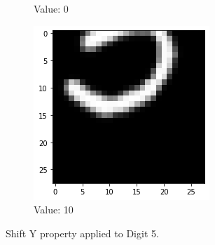 \begin{figure}[htb!]
\begin{subfigure}[b]{.3\textwidth}
            \caption{Value: 0}
            \label{fig:Rotate-misclass0}
        \end{subfigure}%
        \begin{subfigure}[b]{.3\textwidth}
            \centering
            \includegraphics[width=\linewidth]{images/shifty3.png}
            \caption{Value: 10}
            \label{fig:Rotate-misclass0}
        \end{subfigure}
        
        \caption{Shift Y property applied to Digit 5.}
        \label{fig:Rotate-misclassifications}
    \end{figure}
    \FloatBarrier
